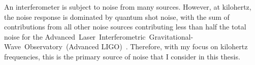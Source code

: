 
An interferometer is subject to noise from many sources. %
However, at kilohertz, the noise response is dominated by quantum shot noise, with the sum of contributions from all other noise sources contributing less than half the total noise for the Advanced~Laser~Interferometric~Gravitational-Wave~Observatory~(Advanced LIGO)~\cite{buikemaSensitivityPerformanceAdvanced2020}. %
Therefore, with my focus on kilohertz frequencies, this is the primary source of noise that I consider in this thesis. %


